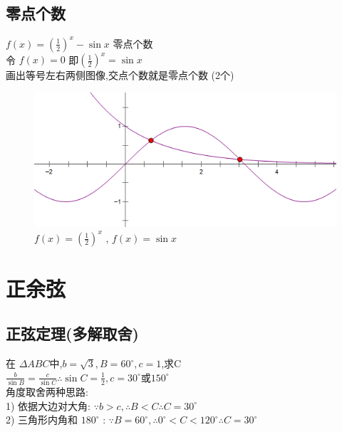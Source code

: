 \documentclass[hyperref, UTF8,11pt,a4paper]{ctexart} %
\begin{document}
\subsection {零点个数}
{\color{red}  $f(x)=\left(\frac{1}{2}\right)^{x}-\sin x$ 零点个数} \\
令 $f(x)=0$ 即$\left(\frac{1}{2}\right)^{x}=\sin x$ \\
画出等号左右两侧图像,交点个数就是零点个数 (2个)
\begin{figure}[h] %
	\begin{center}
		\includegraphics[scale=0.5]  {pic/sanjiaohanshu/lingdiangeshu.png}
		\caption{$f(x)=\left(\frac{1}{2}\right)^{x}$ , $f(x)=\sin x$}
	\end{center}
\end{figure}

\newpage
\section{正余弦}
\subsection{正弦定理(多解取舍)}
{\color{red} 在 $\Delta A B C$中,$b=\sqrt{3}, B=60^{\circ}, c=1$,求C } \\
$ \frac{b}{\sin B}=\frac{c}{\sin C} \therefore \sin C=\frac{1}{2}, c=30^{\circ}$或$150^{\circ}$ \\
角度取舍两种思路:\\
1) 依据大边对大角:  \quad
$\because b>c,  \therefore B<C \therefore C=30^{\circ}$ \\
2) 三角形内角和 $180^{\circ}$ : \quad
$ \because   B=60^{\circ}, \therefore 0^{\circ}<C<120^{\circ}  \therefore C=30^{\circ}$ \\
\end{document}
